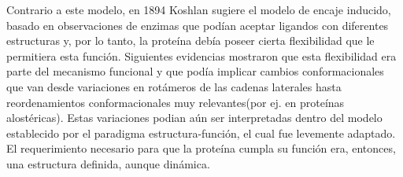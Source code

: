 Contrario a este modelo, en 1894 Koshlan sugiere el modelo de encaje inducido, basado en observaciones de enzimas que podían aceptar 
ligandos con diferentes estructuras y, por lo tanto, la proteína debía poseer cierta flexibilidad que le permitiera esta función.
Siguientes evidencias mostraron que esta flexibilidad era parte del mecanismo funcional y que podía implicar cambios conformacionales que van desde variaciones en rotámeros de las cadenas laterales hasta 
reordenamientos conformacionales muy relevantes(por ej. en proteínas alostéricas).
Estas variaciones podian aún ser interpretadas dentro del modelo establecido por el paradigma estructura-función, el cual fue levemente adaptado.
El requerimiento necesario para que la proteína cumpla su función era, entonces, una estructura definida, aunque dinámica. 

